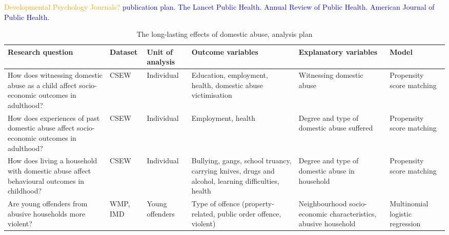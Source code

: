 \documentclass[11pt, a4paper]{article}
\newcommand{\TM}[1] {{\textcolor{orange}{#1}}}
\newcommand{\AT}[1] {{\textcolor{blue}{#1}}}
\begin{document}
 \TM{Developmental Psychology Journals?}
 \AT{publication plan. The Lancet Public Health. Annual Review of Public Health. American Journal of Public Health.}



\begin{table}[!htbp]
\caption{The long-lasting effects of domestic abuse, analysis plan}
  \begin{threeparttable}[t]
  \centering
       \begin{tabular}{ L{3.9cm}  C{1cm}  C{1.9cm}  C{3.2cm}  C{2.8cm}  C{1.6cm} }
    \toprule
     \textbf{Research question} & \textbf{Dataset}    & \textbf{Unit of analysis} & \textbf{Outcome variables} & \textbf{Explanatory variables} & \textbf{Model} \\
    \midrule
    How does witnessing domestic abuse as a child affect socio-economic outcomes in adulthood? & CSEW & Individual & Education, employment, health, domestic abuse victimisation & Witnessing domestic abuse & Propensity score matching \\
                \midrule
                   How does experiences of past domestic abuse affect socio-economic outcomes in adulthood? & CSEW & Individual & Employment, health & Degree and type of domestic abuse suffered & Propensity score matching \\
                \midrule
     How does living a household with domestic abuse affect behavioural outcomes in childhood? & CSEW & Individual & Bullying, gangs, school truancy, carrying knives, drugs and alcohol, learning difficulties, health & Degree and type of domestic abuse in household & Propensity score matching \\
                \midrule
          Are young offenders from abusive households more violent? & WMP, IMD & Young offenders & Type of offence (property-related, public order offence, violent) & Neighbourhood socio-economic characteristics, abusive household & Multinomial logistic regression \\
     \bottomrule
  \end{tabular}
    \end{threeparttable}%
  \label{tab:addlabel}%
\end{table}%
\end{document}
